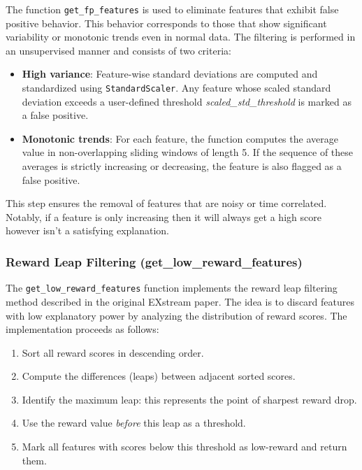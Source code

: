 \documentclass[11pt]{article}
\begin{document}
The function \texttt{get\_fp\_features} is used to eliminate features that exhibit false positive behavior. This behavior corresponds to those that show significant variability or monotonic trends even in normal data. The filtering is performed in an unsupervised manner and consists of two criteria:

\begin{itemize}
  \item \textbf{High variance}: Feature-wise standard deviations are computed and standardized using \texttt{StandardScaler}. Any feature whose scaled standard deviation exceeds a user-defined threshold \textit{scaled\_std\_threshold} is marked as a false positive.
  \item \textbf{Monotonic trends}: For each feature, the function computes the average value in non-overlapping sliding windows of length 5. If the sequence of these averages is strictly increasing or decreasing, the feature is also flagged as a false positive.
\end{itemize}

This step ensures the removal of features that are noisy or time correlated. Notably, if a feature is only increasing then it will always get a high score however isn't a satisfying explanation.

\subsubsection{Reward Leap Filtering (get\_low\_reward\_features)}

The \texttt{get\_low\_reward\_features} function implements the reward leap filtering method described in the original EXstream paper. The idea is to discard features with low explanatory power by analyzing the distribution of reward scores. The implementation proceeds as follows:

\begin{enumerate}
  \item Sort all reward scores in descending order.
  \item Compute the differences (leaps) between adjacent sorted scores.
  \item Identify the maximum leap: this represents the point of sharpest reward drop.
  \item Use the reward value \textit{before} this leap as a threshold.
  \item Mark all features with scores below this threshold as low-reward and return them.
\end{enumerate}
\end{document}
